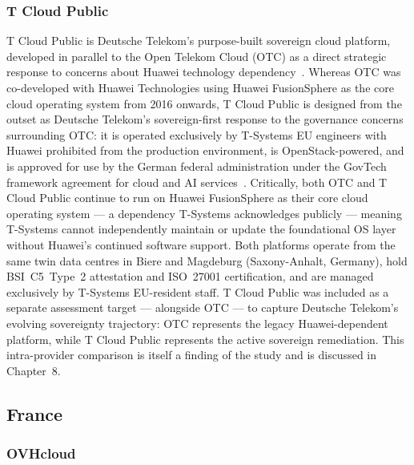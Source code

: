 \subsubsection{T Cloud Public}

T Cloud Public is Deutsche Telekom's purpose-built sovereign cloud platform, developed in parallel to the Open Telekom Cloud (OTC) as a direct strategic response to concerns about Huawei technology dependency~\cite{OTC_About}. Whereas OTC was co-developed with Huawei Technologies using Huawei FusionSphere as the core cloud operating system from 2016 onwards, T Cloud Public is designed from the outset as Deutsche Telekom's sovereign-first response to the governance concerns surrounding OTC: it is operated exclusively by T-Systems EU engineers with Huawei prohibited from the production environment, is OpenStack-powered, and is approved for use by the German federal administration under the GovTech framework agreement for cloud and AI services~\cite{Kramer_PersonalComm_2026}. Critically, both OTC and T Cloud Public continue to run on Huawei FusionSphere as their core cloud operating system — a dependency T-Systems acknowledges publicly — meaning T-Systems cannot independently maintain or update the foundational OS layer without Huawei's continued software support. Both platforms operate from the same twin data centres in Biere and Magdeburg (Saxony-Anhalt, Germany), hold BSI~C5~Type~2 attestation and ISO~27001 certification, and are managed exclusively by T-Systems EU-resident staff. T Cloud Public was included as a separate assessment target — alongside OTC — to capture Deutsche Telekom's evolving sovereignty trajectory: OTC represents the legacy Huawei-dependent platform, while T Cloud Public represents the active sovereign remediation. This intra-provider comparison is itself a finding of the study and is discussed in Chapter~8.

\subsection{France}

\subsubsection{OVHcloud}

